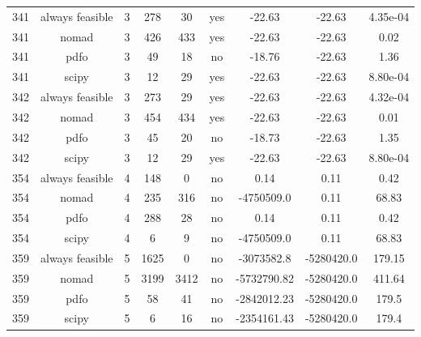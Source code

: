 \begin{scriptsize}
\begin{center}
\begin{longtable}{ccccccccc}
341 & always feasible &  3 &    278 &     30 &     yes &      -22.63 &      -22.63 & 4.35e-04\\
341 &           nomad &  3 &    426 &    433 &     yes &      -22.63 &      -22.63 &     0.02\\
341 &            pdfo &  3 &     49 &     18 &      no &      -18.76 &      -22.63 &     1.36\\
341 &           scipy &  3 &     12 &     29 &     yes &      -22.63 &      -22.63 & 8.80e-04\\
342 & always feasible &  3 &    273 &     29 &     yes &      -22.63 &      -22.63 & 4.32e-04\\
342 &           nomad &  3 &    454 &    434 &     yes &      -22.63 &      -22.63 &     0.01\\
342 &            pdfo &  3 &     45 &     20 &      no &      -18.73 &      -22.63 &     1.35\\
342 &           scipy &  3 &     12 &     29 &     yes &      -22.63 &      -22.63 & 8.80e-04\\
354 & always feasible &  4 &    148 &      0 &      no &        0.14 &        0.11 &     0.42\\
354 &           nomad &  4 &    235 &    316 &      no &  -4750509.0 &        0.11 &    68.83\\
354 &            pdfo &  4 &    288 &     28 &      no &        0.14 &        0.11 &     0.42\\
354 &           scipy &  4 &      6 &      9 &      no &  -4750509.0 &        0.11 &    68.83\\
359 & always feasible &  5 &   1625 &      0 &      no &  -3073582.8 &  -5280420.0 &   179.15\\
359 &           nomad &  5 &   3199 &   3412 &      no & -5732790.82 &  -5280420.0 &   411.64\\
359 &            pdfo &  5 &     58 &     41 &      no & -2842012.23 &  -5280420.0 &    179.5\\
359 &           scipy &  5 &      6 &     16 &      no & -2354161.43 &  -5280420.0 &    179.4
\end{longtable}
\end{center}
\end{scriptsize}



